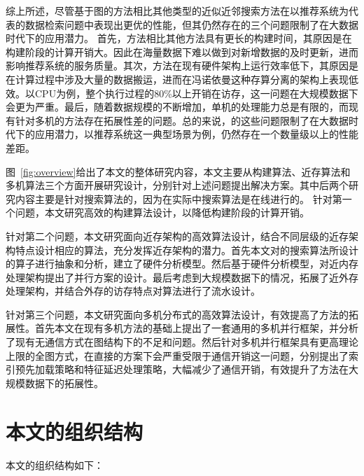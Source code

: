 综上所述，尽管基于图的方法相比其他类型的近似近邻搜索方法在以推荐系统为代表的数据检索问题中表现出更优的性能，但其仍然存在的三个问题限制了在大数据时代下的应用潜力。
首先，\ganns 方法相比其他方法具有更长的构建时间\cite{dpg-2019}，其原因是在构建阶段的计算开销大。因此在海量数据下难以做到对新增数据的及时更新，进而影响推荐系统的服务质量。其次，\ganns 方法在现有硬件架构上运行效率低下，其原因是\ganns 在计算过程中涉及大量的数据搬运，进而在冯诺依曼这种存算分离的架构上表现低效。以CPU为例，整个执行过程的80\%以上开销在访存，这一问题在大规模数据下会更为严重。最后，随着数据规模的不断增加，单机的处理能力总是有限的，而现有针对多机的\ganns 方法存在拓展性差的问题。总的来说，\ganns 的这些问题限制了在大数据时代下的应用潜力，以推荐系统这一典型场景为例，仍然存在一个数量级以上的性能差距。

图~\ref{fig:overview}给出了本文的整体研究内容，本文主要从构建算法、近存算法和多机算法三个方面开展研究设计，分别针对上述问题提出解决方案。其中后两个研究内容主要是针对搜索算法的，因为在实际中搜索算法是在线进行的。
针对第一个问题，本文研究高效的构建算法设计，以降低构建阶段的计算开销。

针对第二个问题，本文研究面向近存架构的高效算法设计，结合不同层级的近存架构特点设计相应的算法，充分发挥近存架构的潜力。首先本文对\ganns 的搜索算法所设计的算子进行抽象和分析，建立了硬件分析模型。然后基于硬件分析模型，对近内存处理架构提出了并行方案的设计。最后考虑到大规模数据下的情况，拓展了近外存处理架构，并结合外存的访存特点对算法进行了流水设计。

针对第三个问题，本文研究面向多机分布式的高效算法设计，有效提高了\ganns 方法的拓展性。首先本文在现有多机方法的基础上提出了一套通用的多机并行框架，并分析了现有无通信方式在图结构下的不足和问题。然后针对多机并行框架具有更高理论上限的全图方式，在直接的方案下会严重受限于通信开销这一问题，分别提出了索引预先加载策略和特征延迟处理策略，大幅减少了通信开销，有效提升了\ganns 方法在大规模数据下的拓展性。




\section{本文的组织结构}
本文的组织结构如下：

